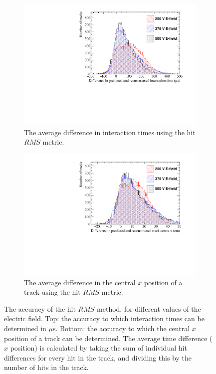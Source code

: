 \begin{figure}
  \centering
  \begin{subfigure}{0.6\textwidth}
    \centering
    \includegraphics[width=\textwidth]{Canvas_AvDiff_T_RMS_ElecField}
    \caption{The average difference in interaction times using the hit $RMS$ metric.}
    \label{fig:DiffElecStudy_AvDiffRMS_T}
  \end{subfigure}
  \begin{subfigure}{0.6\textwidth}
    \centering
    \includegraphics[width=\textwidth]{Canvas_AvDiff_X_RMS_ElecField}
    \caption{The average difference in the central $x$ position of a track using the hit $RMS$ metric.}
    \label{fig:DiffElecStudy_AvDiffRMS_X}
  \end{subfigure}
  \caption[Comparing the accuracy of the hit $RMS$ method, as the electric field changes]
          {The accuracy of the hit $RMS$ method, for different values of the electric field. Top: the accuracy to which interaction times can be determined in $\mu$s. Bottom: the accuracy to which the central $x$ position of a track can be determined. The average time difference ($x$ position) is calculated by taking the sum of individual hit differences for every hit in the track, and dividing this by the number of hits in the track.}
  \label{fig:DiffElecStudy_AvDiff_RMS}
\end{figure}

